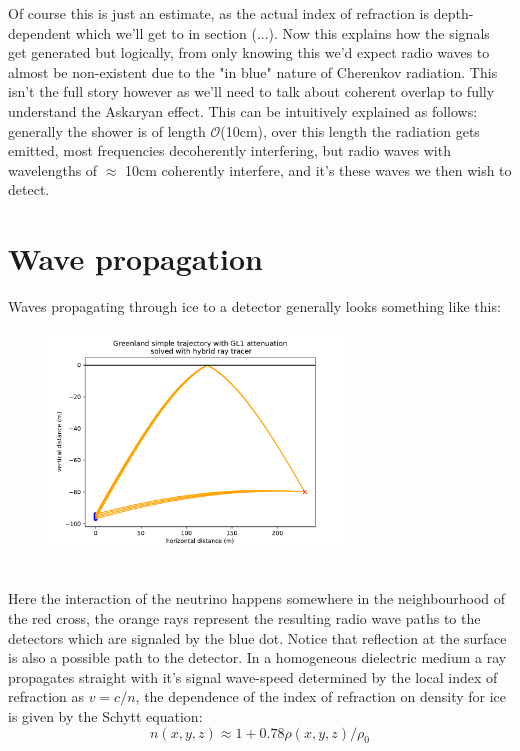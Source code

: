 \documentclass[11pt,a4paper,faculty=we,language=en,doctype=report]{cls/ugent-doc}
\begin{document}
Of course this is just an estimate, as the actual index of refraction is depth-dependent which
we'll get to in section (...).
Now this explains how the signals get generated but logically, from only knowing this
we'd expect radio waves to almost be non-existent 
due to the "in blue" nature of Cherenkov radiation. 
This isn't the full story however as we'll need to talk about coherent overlap
to fully understand the Askaryan effect. This can be intuitively explained as
follows: generally the shower is of length
$\mathcal{O}$(10cm)\cite{Huege_2017}, over this length the radiation gets
emitted, most frequencies decoherently interfering, but radio waves with wavelengths of 
$\approx$ 10cm coherently interfere, and it's these waves we then wish to detect.
\section{Wave propagation}
Waves propagating through ice to a detector generally looks something like this:
\begin{figure}[h!]
	\centering
	\includegraphics[width=0.7\textwidth]{Path_illu.pdf}
\end{figure}\\
Here the interaction of the neutrino happens somewhere in the neighbourhood of the red cross,
the orange rays represent the resulting radio wave paths to the detectors which are signaled
by the blue dot. Notice that reflection at the surface is also a
possible path to the detector.
In a homogeneous dielectric medium a ray propagates straight 
with it's signal wave-speed determined by the local index of 
refraction as $v = c/n$, 
the dependence of the index of refraction on density
for ice is given by the Schytt equation:
\begin{equation}
	n(x,y,z) \approx 1 + 0.78\rho(x,y,z)/\rho_0
\end{equation}
\end{document}
